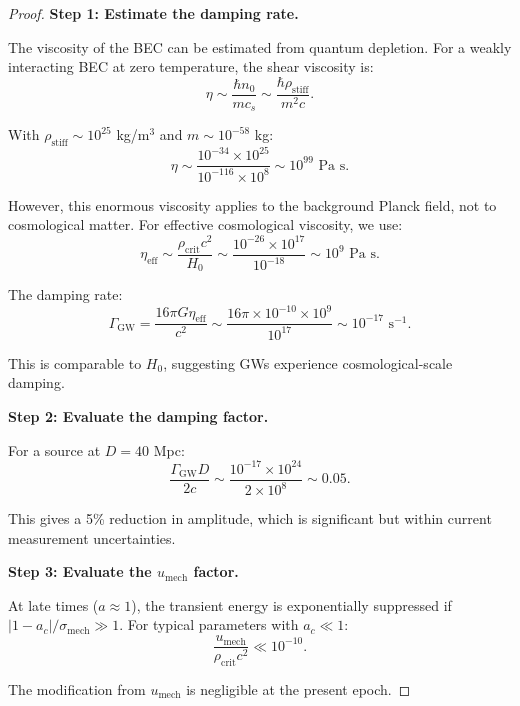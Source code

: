 \documentclass[11pt,a4paper]{article}
\newcommand{\rhocrit}{\ensuremath{\rho_{\mathrm{crit}}}}
\newcommand{\rhostiff}{\ensuremath{\rho_{\mathrm{stiff}}}}
\newcommand{\umech}{\ensuremath{u_{\mathrm{mech}}}}
\theoremstyle{definition}
\theoremstyle{remark}
\begin{document}
\begin{proof}
\textbf{Step 1: Estimate the damping rate.}

The viscosity of the BEC can be estimated from quantum depletion. For a weakly interacting BEC at zero temperature, the shear viscosity is:
\begin{equation}
\eta \sim \frac{\hbar n_0}{mc_s} \sim \frac{\hbar \rhostiff}{m^2 c}.
\end{equation}

With $\rhostiff \sim 10^{25}$ kg/m$^3$ and $m \sim 10^{-58}$ kg:
\begin{equation}
\eta \sim \frac{10^{-34} \times 10^{25}}{10^{-116} \times 10^8} \sim 10^{99} \text{ Pa s}.
\end{equation}

However, this enormous viscosity applies to the background Planck field, not to cosmological matter. For effective cosmological viscosity, we use:
\begin{equation}
\eta_{\mathrm{eff}} \sim \frac{\rhocrit c^2}{H_0} \sim \frac{10^{-26} \times 10^{17}}{10^{-18}} \sim 10^9 \text{ Pa s}.
\end{equation}

The damping rate:
\begin{equation}
\Gamma_{\mathrm{GW}} = \frac{16\pi G\eta_{\mathrm{eff}}}{c^2} \sim \frac{16\pi \times 10^{-10} \times 10^9}{10^{17}} \sim 10^{-17} \text{ s}^{-1}.
\end{equation}

This is comparable to $H_0$, suggesting GWs experience cosmological-scale damping.

\textbf{Step 2: Evaluate the damping factor.}

For a source at $D = 40$ Mpc:
\begin{equation}
\frac{\Gamma_{\mathrm{GW}} D}{2c} \sim \frac{10^{-17} \times 10^{24}}{2 \times 10^8} \sim 0.05.
\end{equation}

This gives a 5\% reduction in amplitude, which is significant but within current measurement uncertainties.

\textbf{Step 3: Evaluate the $\umech$ factor.}

At late times ($a \approx 1$), the transient energy is exponentially suppressed if $|1 - a_c|/\sigma_{\mathrm{mech}} \gg 1$. For typical parameters with $a_c \ll 1$:
\begin{equation}
\frac{\umech}{\rhocrit c^2} \ll 10^{-10}.
\end{equation}

The modification from $\umech$ is negligible at the present epoch. \qedhere
\end{proof}
\end{document}
